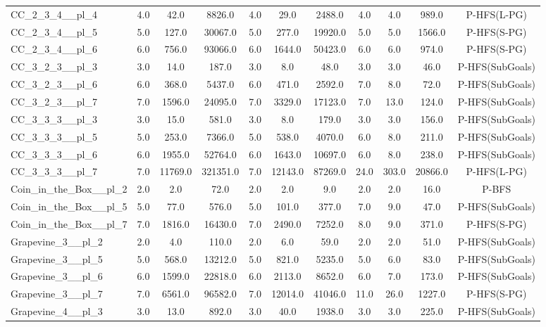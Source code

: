 \begin{table}[!ht]
\begin{tabular}{l|ccc|ccc|cccc}
CC\_2\_3\_4\_\_pl\_4 & 4.0 & 42.0 & 8826.0 & 4.0 & 29.0 & 2488.0 & 4.0 & 4.0 & 989.0 & P-HFS(L-PG) \\
CC\_2\_3\_4\_\_pl\_5 & 5.0 & 127.0 & 30067.0 & 5.0 & 277.0 & 19920.0 & 5.0 & 5.0 & 1566.0 & P-HFS(S-PG) \\
CC\_2\_3\_4\_\_pl\_6 & 6.0 & 756.0 & 93066.0 & 6.0 & 1644.0 & 50423.0 & 6.0 & 6.0 & 974.0 & P-HFS(S-PG) \\
CC\_3\_2\_3\_\_pl\_3 & 3.0 & 14.0 & 187.0 & 3.0 & 8.0 & 48.0 & 3.0 & 3.0 & 46.0 & P-HFS(SubGoals) \\
CC\_3\_2\_3\_\_pl\_6 & 6.0 & 368.0 & 5437.0 & 6.0 & 471.0 & 2592.0 & 7.0 & 8.0 & 72.0 & P-HFS(SubGoals) \\
CC\_3\_2\_3\_\_pl\_7 & 7.0 & 1596.0 & 24095.0 & 7.0 & 3329.0 & 17123.0 & 7.0 & 13.0 & 124.0 & P-HFS(SubGoals) \\
CC\_3\_3\_3\_\_pl\_3 & 3.0 & 15.0 & 581.0 & 3.0 & 8.0 & 179.0 & 3.0 & 3.0 & 156.0 & P-HFS(SubGoals) \\
CC\_3\_3\_3\_\_pl\_5 & 5.0 & 253.0 & 7366.0 & 5.0 & 538.0 & 4070.0 & 6.0 & 8.0 & 211.0 & P-HFS(SubGoals) \\
CC\_3\_3\_3\_\_pl\_6 & 6.0 & 1955.0 & 52764.0 & 6.0 & 1643.0 & 10697.0 & 6.0 & 8.0 & 238.0 & P-HFS(SubGoals) \\
CC\_3\_3\_3\_\_pl\_7 & 7.0 & 11769.0 & 321351.0 & 7.0 & 12143.0 & 87269.0 & 24.0 & 303.0 & 20866.0 & P-HFS(L-PG) \\
Coin\_in\_the\_Box\_\_pl\_2 & 2.0 & 2.0 & 72.0 & 2.0 & 2.0 & 9.0 & 2.0 & 2.0 & 16.0 & P-BFS \\
Coin\_in\_the\_Box\_\_pl\_5 & 5.0 & 77.0 & 576.0 & 5.0 & 101.0 & 377.0 & 7.0 & 9.0 & 47.0 & P-HFS(SubGoals) \\
Coin\_in\_the\_Box\_\_pl\_7 & 7.0 & 1816.0 & 16430.0 & 7.0 & 2490.0 & 7252.0 & 8.0 & 9.0 & 371.0 & P-HFS(S-PG) \\
Grapevine\_3\_\_pl\_2 & 2.0 & 4.0 & 110.0 & 2.0 & 6.0 & 59.0 & 2.0 & 2.0 & 51.0 & P-HFS(SubGoals) \\
Grapevine\_3\_\_pl\_5 & 5.0 & 568.0 & 13212.0 & 5.0 & 821.0 & 5235.0 & 5.0 & 6.0 & 83.0 & P-HFS(SubGoals) \\
Grapevine\_3\_\_pl\_6 & 6.0 & 1599.0 & 22818.0 & 6.0 & 2113.0 & 8652.0 & 6.0 & 7.0 & 173.0 & P-HFS(SubGoals) \\
Grapevine\_3\_\_pl\_7 & 7.0 & 6561.0 & 96582.0 & 7.0 & 12014.0 & 41046.0 & 11.0 & 26.0 & 1227.0 & P-HFS(S-PG) \\
Grapevine\_4\_\_pl\_3 & 3.0 & 13.0 & 892.0 & 3.0 & 40.0 & 1938.0 & 3.0 & 3.0 & 225.0 & P-HFS(SubGoals) \\

\end{tabular}
\end{table}
